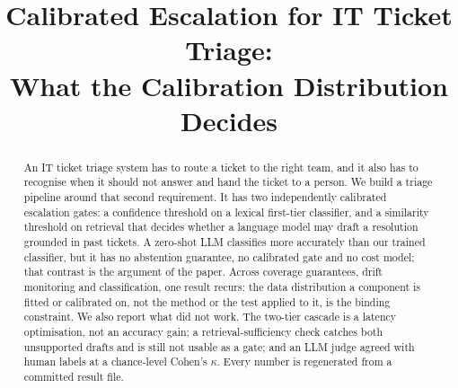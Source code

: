 \documentclass[conference,a4paper]{IEEEtran}
\begin{document}
\title{Calibrated Escalation for IT Ticket Triage:\\
What the Calibration Distribution Decides}

\author{
}

\maketitle

\begin{abstract}
An IT ticket triage system has to route a ticket to the right team, and it also has to recognise when it should not answer and hand the ticket to a person. We build a triage pipeline around that second requirement. It has two independently calibrated escalation gates: a confidence threshold on a lexical first-tier classifier, and a similarity threshold on retrieval that decides whether a language model may draft a resolution grounded in past tickets. A zero-shot LLM classifies more accurately than our trained classifier, but it has no abstention guarantee, no calibrated gate and no cost model; that contrast is the argument of the paper. Across coverage guarantees, drift monitoring and classification, one result recurs: the data distribution a component is fitted or calibrated on, not the method or the test applied to it, is the binding constraint. We also report what did not work. The two-tier cascade is a latency optimisation, not an accuracy gain; a retrieval-sufficiency check catches both unsupported drafts and is still not usable as a gate; and an LLM judge agreed with human labels at a chance-level Cohen's $\kappa$. Every number is regenerated from a committed result file.
\end{abstract}
\end{document}

